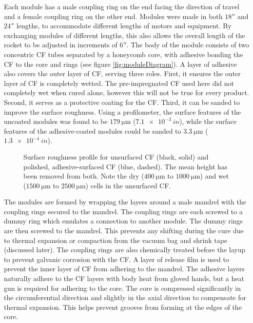 \documentclass{aiaa-tc}%
\begin{document}
Each module has a male coupling ring on the end facing the direction of travel and a female coupling ring on the other end. 
Modules were made in both $18''$ and $24''$ lengths, to accommodate different lengths of motors and equipment. 
By exchanging modules of different lengths, this also allows the overall length of the rocket to be adjusted in increments of $6''$.
The body of the module consists of two concentric CF tubes separated by a honeycomb core, with adhesive bonding the CF to the core and rings (see figure \ref{fig:moduleDiagram}). 
A layer of adhesive also covers the outer layer of CF, serving three roles. First, it ensures the outer layer of CF is completely wetted. 
The pre-impregnated CF used here did not completely wet when cured alone, however this will not be true for every product.
Second, it serves as a protective coating for the CF. 
Third, it can be sanded to improve the surface roughness.
Using a profilometer, the surface features of the uncoated modules was found to be $\SI{179}{\micro\meter}$ ($\SI{7.1e-3}{in}$), while the surface features of the adhesive-coated modules could be sanded to $\SI{3.3}{\micro\meter}$ ($\SI{1.3e-4}{in}$).

\begin{figure}
\centering

\caption{Surface roughness profile for unsurfaced CF (black, solid) and polished, adhesive-surfaced CF (blue, dashed). The mean height has been removed from both. Note the dry ($\SI{400}{\micro\meter}$ to $\SI{1000}{\micro\meter}$) and wet ($\SI{1500}{\micro\meter}$ to $\SI{2500}{\micro\meter}$) cells in the unsurfaced CF.}
\label{fig:roughness}
\end{figure}

The modules are formed by wrapping the layers around a male mandrel with the coupling rings secured to the mandrel.
The coupling rings are each screwed to a dummy ring which emulates a connection to another module. The dummy rings are then screwed to the mandrel.
This prevents any shifting during the cure due to thermal expansion or compaction from the vacuum bag and shrink tape (discussed later).
The coupling rings are also chemically treated before the layup to prevent galvanic corrosion with the CF.
A layer of release film is used to prevent the inner layer of CF from adhering to the mandrel. 
The adhesive layers naturally adhere to the CF layers with body heat from gloved hands, but a heat gun is required for adhering to the core. 
The core is compressed significantly in the circumferential direction and slightly in the axial direction to compensate for thermal expansion. This helps prevent grooves from forming at the edges of the core.
\end{document}
